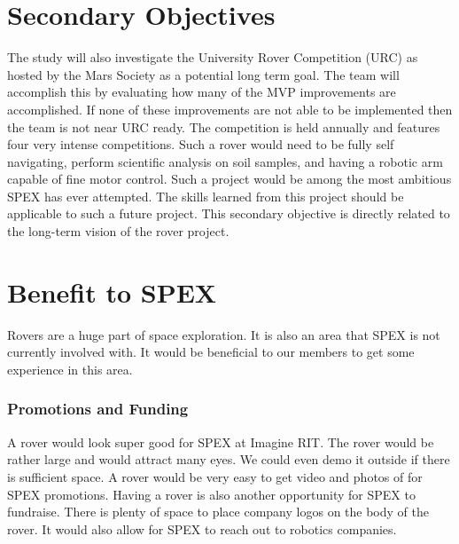 \documentclass[conference]{IEEEtran} %
\begin{document}

\section{Secondary Objectives}
\label{sec:secondary-obj}
The study will also investigate the University Rover Competition (URC) as hosted by the Mars Society as a potential long term goal. 
The team will accomplish this by evaluating how many of the MVP improvements are accomplished. 
If none of these improvements are not able to be implemented then the team is not near URC ready.
The competition is held annually and features four very intense competitions. 
Such a rover would need to be fully self navigating, perform scientific analysis on soil samples, and having a robotic arm capable of fine motor control. 
Such a project would be among the most ambitious SPEX has ever attempted. The skills learned from this project should be applicable to such a future project. 
This secondary objective is directly related to the long-term vision of the rover project. 

\section{Benefit to SPEX}
\label{sec:benefit}

Rovers are a huge part of space exploration. 
It is also an area that SPEX is not currently involved with. 
It would be beneficial to our members to get some experience in this area.
\subsubsection{Promotions and Funding}
\label{promos}
A rover would look super good for SPEX at Imagine RIT. 
The rover would be rather large and would attract many eyes. We could even demo it outside if there is sufficient space. 
A rover would be very easy to get video and photos of for SPEX promotions. 
Having a rover is also another opportunity for SPEX to fundraise. 
There is plenty of space to place company logos on the body of the rover. 
It would also allow for SPEX to reach out to robotics companies.
\end{document}
